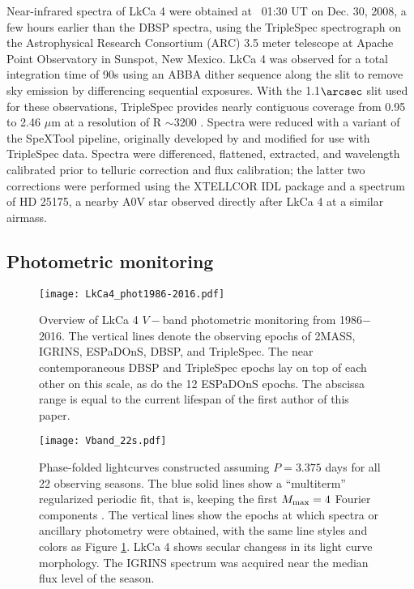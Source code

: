 \documentclass[twocolumn]{emulateapj}%
\newcommand{\name}{LkCa 4 }
\begin{document}
Near-infrared spectra of LkCa 4 were obtained at ~01:30 UT on Dec. 30, 2008, a few hours earlier than the DBSP spectra, using the TripleSpec spectrograph on the Astrophysical Research Consortium (ARC) 3.5 meter telescope at Apache Point Observatory in Sunspot, New Mexico. LkCa 4 was observed for a total integration time of 90s using an ABBA dither sequence along the slit to remove sky emission by differencing sequential exposures.  With the 1.1$\arcsec$ slit used for these observations, TripleSpec provides nearly contiguous coverage from 0.95 to 2.46 $\mu$m at a resolution of  R $\sim$3200 \citep{wilson04}. Spectra were reduced with a variant of the SpeXTool pipeline, originally developed by \citet{cushing04} and modified for use with TripleSpec data. Spectra were differenced, flattened, extracted, and wavelength calibrated prior to telluric correction and flux calibration; the latter two corrections were performed using the XTELLCOR IDL package \citep{vacca03} and a spectrum of HD 25175, a nearby A0V star observed directly after LkCa 4 at a similar airmass. 


\subsection{Photometric monitoring}

\begin{figure*}
 \centering
 \texttt{[image: LkCa4\_phot1986-2016.pdf]}
 \caption{Overview of \name $V-$band photometric monitoring from 1986$-$2016.  The vertical lines denote the observing epochs of 2MASS, IGRINS, ESPaDOnS, DBSP, and TripleSpec.  The near contemporaneous DBSP and TripleSpec epochs lay on top of each other on this scale, as do the 12 ESPaDOnS epochs.  The abscissa range is equal to the current lifespan of the first author of this paper.}
 \label{fig:PhotTime}
\end{figure*}

\begin{figure*}
 \centering
 \texttt{[image: Vband\_22s.pdf]}
 \caption{Phase-folded lightcurves constructed assuming $P=3.375$ days for all 22 observing seasons.  The blue solid lines show a ``multiterm'' regularized periodic fit, that is, keeping the first $M_{\rm max}=4$ Fourier components \citep{vanderplas15a}.  The vertical lines show the epochs at which spectra or ancillary photometry were obtained, with the same line styles and colors as Figure \ref{fig:PhotTime}.  LkCa 4 shows secular changess in its light curve morphology.  The IGRINS spectrum was acquired near the median flux level of the season.}
 \label{fig:PhotPhase}
\end{figure*}
\end{document}
